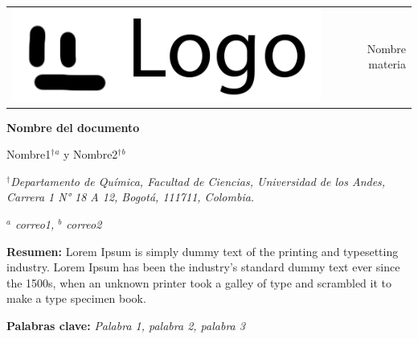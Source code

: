 \documentclass[11pt,fleqn]{article} %
\begin{document}
	\onehalfspacing %
	\setlength{\parskip}{0cm} %
	\setlength{\parindent}{0cm} %
	
	\begin{small}
		\begin{tabularx}{\textwidth}{Y r}
			& \\
			& \large \textcolor{Micolor}{Nombre materia} \\
			& 
		\end{tabularx}
	\end{small}
	
	\begin{flushleft}
		\textcolor{Micolor}{\Large \textbf{Nombre del documento}}
	\end{flushleft}

	Nombre1$^{\dag}$$^{a}$ y Nombre2$^{\dag}$$^{b}$
	
	\begin{small}
		\textit{$^{\dag}$Departamento de Química, Facultad de Ciencias, Universidad de los Andes, Carrera 1 N° 18 A 12, Bogotá, 111711, Colombia.}
		
		\textit{$^{a}$ correo1, $^{b}$ correo2}
		
		\linhor %
		
		\textcolor{Micolor}{\textbf{Resumen:}} Lorem Ipsum is simply dummy text of the printing and typesetting industry. Lorem Ipsum has been the industry's standard dummy text ever since the 1500s, when an unknown printer took a galley of type and scrambled it to make a type specimen book.  
	
		\textcolor{Micolor}{\textbf{Palabras clave:}} \textit{Palabra 1, palabra 2, palabra 3}
		
		\linhor
	\end{small}
	
	\setlength{\columnsep}{0.63cm} %
	
\end{document}
